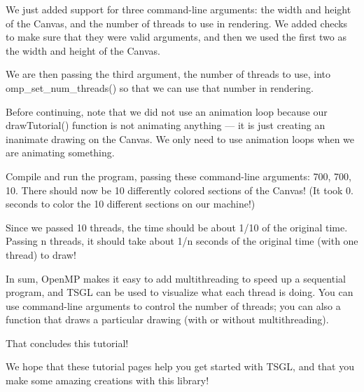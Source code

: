 We just added support for three command-\/line arguments\-: the width and height of the Canvas, and the number of threads to use in rendering. We added checks to make sure that they were valid arguments, and then we used the first two as the width and height of the Canvas.

We are then passing the third argument, the number of threads to use, into {\ttfamily omp\-\_\-set\-\_\-num\-\_\-threads()} so that we can use that number in rendering.

Before continuing, note that we did not use an animation loop because our {\ttfamily draw\-Tutorial()} function is not animating anything — it is just creating an inanimate drawing on the Canvas. We only need to use animation loops when we are animating something.

Compile and run the program, passing these command-\/line arguments\-: 700, 700, 10. There should now be 10 differently colored sections of the Canvas! (It took 0. seconds to color the 10 different sections on our machine!)

Since we passed 10 threads, the time should be about 1/10 of the original time. Passing n threads, it should take about 1/n seconds of the original time (with one thread) to draw!

In sum, Open\-M\-P makes it easy to add multithreading to speed up a sequential program, and T\-S\-G\-L can be used to visualize what each thread is doing. You can use command-\/line arguments to control the number of threads; you can also a function that draws a particular drawing (with or without multithreading).

That concludes this tutorial!

We hope that these tutorial pages help you get started with T\-S\-G\-L, and that you make some amazing creations with this library! 